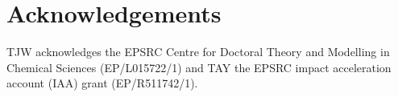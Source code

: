 \documentclass[twoside,twocolumn,9pt]{article}
\renewcommand{\refname}{Notes and references}
\begin{document}
\section*{Acknowledgements}
TJW acknowledges the EPSRC Centre for Doctoral Theory and Modelling in Chemical Sciences (EP/L015722/1) and TAY the EPSRC impact acceleration account (IAA) grant (EP/R511742/1). 







\scriptsize{
 } %
\end{document}
